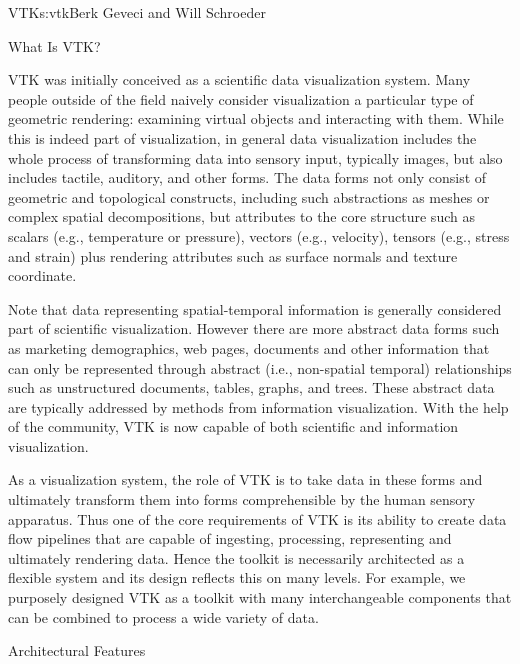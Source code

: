 \begin{aosachapter}{VTK}{s:vtk}{Berk Geveci and Will Schroeder}
\begin{aosasect1}{What Is VTK?}

VTK was initially conceived as a scientific data visualization
system. Many people outside of the field naively consider
visualization a particular type of geometric rendering: examining
virtual objects and interacting with them. While this is indeed part
of visualization, in general data visualization includes the whole
process of transforming data into sensory input, typically images, but
also includes tactile, auditory, and other forms. The data forms not
only consist of geometric and topological constructs, including such
abstractions as meshes or complex spatial decompositions, but
attributes to the core structure such as scalars (e.g., temperature or
pressure), vectors (e.g., velocity), tensors (e.g., stress and strain)
plus rendering attributes such as surface normals and texture
coordinate.

Note that data representing spatial-temporal information is generally
considered part of scientific visualization. However there are more
abstract data forms such as marketing demographics, web pages,
documents and other information that can only be represented through
abstract (i.e., non-spatial temporal) relationships such as
unstructured documents, tables, graphs, and trees. These abstract data
are typically addressed by methods from information
visualization. With the help of the community, VTK is now capable of
both scientific and information visualization.

As a visualization system, the role of VTK is to take data in these
forms and ultimately transform them into forms comprehensible by the
human sensory apparatus. Thus one of the core requirements of VTK is
its ability to create data flow pipelines that are capable of
ingesting, processing, representing and ultimately rendering
data. Hence the toolkit is necessarily architected as a flexible
system and its design reflects this on many levels. For example, we
purposely designed VTK as a toolkit with many interchangeable
components that can be combined to process a wide variety of data.

\end{aosasect1}

\begin{aosasect1}{Architectural Features}


\end{aosasect1}
\end{aosachapter}
